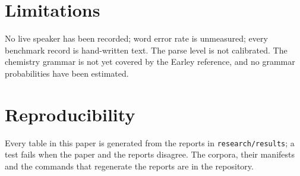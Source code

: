 \documentclass[11pt,a4paper]{article}
\begin{document}
\section{Limitations}
No live speaker has been recorded; word error rate is unmeasured; every
benchmark record is hand-written text. The parse level is not calibrated.
The chemistry grammar is not yet covered by the Earley reference, and no
grammar probabilities have been estimated.

\section{Reproducibility}
Every table in this paper is generated from the reports in
\texttt{research/results}; a test fails when the paper and the reports
disagree. The corpora, their manifests and the commands that regenerate the
reports are in the repository.



\end{document}
